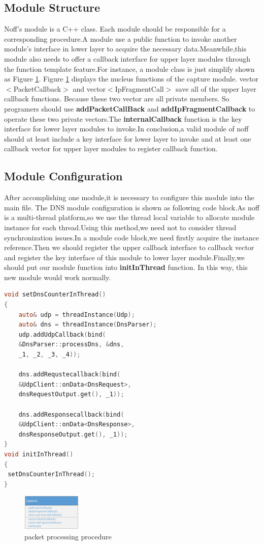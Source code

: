 \documentclass[conference]{IEEEtran}
\begin{document}
\subsection{Module Structure}
Noff's module is a C++ class. Each module should be responsible for a corresponding procedure.A module use a public function to invoke another module's interface in lower layer to acquire the necessary data.Meanwhile,this module also needs to offer a callback interface for upper layer modules through the function template feature.For instance, a module class is just simplify shown as Figure \ref{fig:4}. \newline\indent Figure \ref{fig:4} displays the nucleus functions of the capture module. vector$<$PacketCallback$>$ and vector$<$IpFragmentCall$>$ save all of the upper layer callback functions. Because these two vector are all private members. So programers should use \textbf{addPacketCallBack} and \textbf{addIpFragmentCallback} to operate these two private vectors.The \textbf{internalCallback} function is the key interface for lower layer modules to invoke.In conclusion,a valid module of noff should at least include a key interface for lower layer to invoke and at least one callback vector for upper layer modules to register callback function.
\subsection{Module Configuration}
After accomplishing one module,it is necessary to configure this module into the main file. The DNS module configuration is shown as following code block.As noff is a multi-thread platform,so we use the thread local variable to allocate module instance for each thread.Using this method,we need not to consider thread synchronization issues.In a module code block,we need firstly acquire the instance reference.Then we  should register the upper callback interface to callback vector and register the key interface of this module to lower layer module.Finally,we should put our module function into \textbf{initInThread} function. In this way, this new module would work normally.
\begin{lstlisting}[language=C]
void setDnsCounterInThread()
{
    auto& udp = threadInstance(Udp);
    auto& dns = threadInstance(DnsParser);
    udp.addUdpCallback(bind(
    &DnsParser::processDns, &dns, 
    _1, _2, _3, _4));

    dns.addRequstecallback(bind(
    &UdpClient::onData<DnsRequest>,
    dnsRequestOutput.get(), _1));

    dns.addResponsecallback(bind(
    &UdpClient::onData<DnsResponse>,
    dnsResponseOutput.get(), _1));
}
void initInThread()
{
 setDnsCounterInThread();
}
\end{lstlisting}
\begin{figure}[htbp]
  \centering
  \includegraphics[width=0.25\textwidth]{./picture/Figure4.jpg}
  \caption{packet processing procedure}
  \label{fig:4}
\end{figure}
\end{document}
